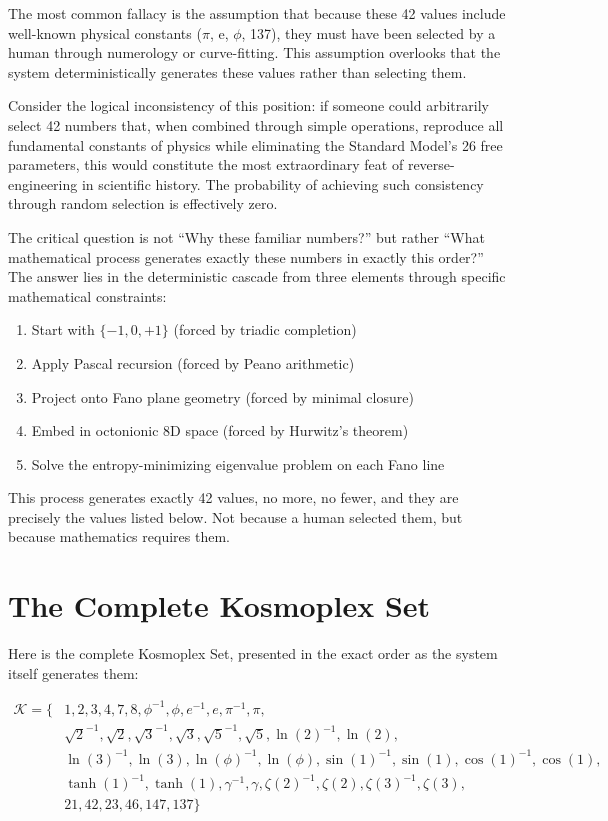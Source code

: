 \documentclass[pdflatex,sn-mathphys-num]{sn-jnl}
\theoremstyle{thmstyleone}
\theoremstyle{thmstyletwo}
\theoremstyle{thmstylethree}
\begin{document}
The most common fallacy is the assumption that because these 42 values include well-known physical constants ($\pi$, e, $\phi$, 137), they must have been selected by a human through numerology or curve-fitting. This assumption overlooks that the system deterministically generates these values rather than selecting them.


Consider the logical inconsistency of this position: if someone could arbitrarily select 42 numbers that, when combined through simple operations, reproduce all fundamental constants of physics while eliminating the Standard Model's 26 free parameters, this would constitute the most extraordinary feat of reverse-engineering in scientific history. The probability of achieving such consistency through random selection is effectively zero.

The critical question is not ``Why these familiar numbers?'' but rather ``What mathematical process generates exactly these numbers in exactly this order?'' The answer lies in the deterministic cascade from three elements through specific mathematical constraints:

\begin{enumerate}
\item Start with $\{-1, 0, +1\}$ (forced by triadic completion)
\item Apply Pascal recursion (forced by Peano arithmetic)
\item Project onto Fano plane geometry (forced by minimal closure)
\item Embed in octonionic 8D space (forced by Hurwitz's theorem)
\item Solve the entropy-minimizing eigenvalue problem on each Fano line
\end{enumerate}

This process generates exactly 42 values, no more, no fewer, and they are precisely the values listed below. Not because a human selected them, but because mathematics requires them.

\section{The Complete Kosmoplex Set}


\bigskip Here is the complete Kosmoplex Set, presented in the exact order as the system itself generates them:

\begin{equation}
\begin{aligned}
\mathcal{K} = \{&1, 2, 3, 4, 7, 8, \phi^{-1}, \phi, e^{-1}, e, \pi^{-1}, \pi,\\
&\sqrt{2}^{-1}, \sqrt{2}, \sqrt{3}^{-1}, \sqrt{3}, \sqrt{5}^{-1}, \sqrt{5}, \ln(2)^{-1}, \ln(2),\\
&\ln(3)^{-1}, \ln(3), \ln(\phi)^{-1}, \ln(\phi), \sin(1)^{-1}, \sin(1), \cos(1)^{-1}, \cos(1),\\
&\tanh(1)^{-1}, \tanh(1), \gamma^{-1}, \gamma, \zeta(2)^{-1}, \zeta(2), \zeta(3)^{-1}, \zeta(3),\\
&21, 42, 23, 46, 147, 137\}
\end{aligned}
\end{equation}
\end{document}
